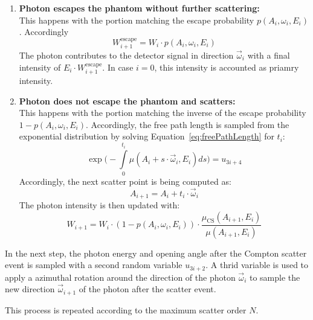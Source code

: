 \begin{enumerate}
    \item \textbf{Photon escapes the phantom without further scattering:}\\
        This happens with the portion matching the escape probability $p(A_i,
        \omega_i, E_i)$. Accordingly 
        \begin{equation}
            W^{\text{escape}}_{i+1} = W_i \cdot p(A_i, \omega_i, E_i)
        \end{equation}
        The photon contributes to the detector signal in direction
        $\vec{\omega}_i$ with a final intensity of $E_i \cdot
        W^{\text{escape}}_{i+1}$. In case $i=0$, this intensity is accounted as
        priamry intensity.

    \item \textbf{Photon does not escape the phantom and scatters:}\\
        This happens with the portion matching the inverse of the escape
        probability $1 - p(A_i, \omega_i, E_i)$. Accordingly, the free path
        length is sampled from the exponential distribution by solving
        Equation~\ref{eq:freePathLength} for $t_i$:
        \begin{equation}
            \label{eq:freePathLength}
            \exp\bigg(-\int\limits_0^{t_i} \mu(A_{i} + s \cdot \vec{\omega}_
            {i}, E_{i}) ds\bigg) = u_{3i+4}
        \end{equation}
        Accordingly, the next scatter point is being computed as:
        \begin{equation}
            A_{i+1} = A_i + t_i \cdot \vec{\omega}_i
        \end{equation}
        The photon intensity is then updated with:
        \begin{equation}
            W_{i+1} = W_i \cdot (1 - p(A_i, \omega_i, E_i)) \cdot \frac{\mu_
            {\text{CS}}(A_{i+1}, E_i)}{\mu(A_{i+1}, E_i)}
        \end{equation}
\end{enumerate}


In the next step, the photon energy and opening angle after the Compton scatter
event is sampled with a second random variable $u_{3i+2}$. A thrid variable is
used to apply a azimuthal rotation around the direction of the photon
$\vec{\omega}_i$ to sample the new direction $\vec{\omega}_{i+1}$ of the photon
after the scatter event.

This process is repeated according to the maximum scatter order $N$.


